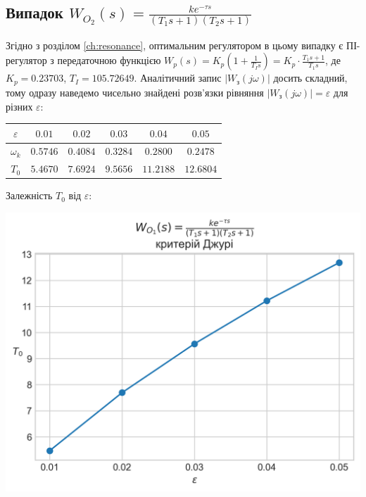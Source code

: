 \subsection{Випадок \texorpdfstring{$W_{O_2}(s) = \frac{k e^{-\tau s}}{(T_1 s + 1)(T_2 s + 1)}$}{2}}
Згідно з розділом \ref{ch:resonance}, оптимальним регулятором в цьому випадку є ПІ-регулятор з передаточною функцією 
$W_p(s) = K_p \left(1 + \frac{1}{T_I s}\right) = K_p \cdot \frac{T_1 s + 1}{T_1 s}$, де $K_p = 0.23703$, $T_I = 105.72649$.
Аналітичний запис $\left| W_{\text{з}}(j\omega) \right|$ досить складний, тому одразу наведемо чисельно знайдені розв'язки
рівняння $\left| W_{\text{з}}(j\omega) \right| = \varepsilon$ для різних $\varepsilon$:
\begin{center}
    \begin{tabular}{|c|c|c|c|c|c|}
        \hline
        $\varepsilon$ & $0.01$ & $0.02$ & $0.03$ & $0.04$ & $0.05$ \\
        \hline
        $\omega_k$ & $0.5746$ & $0.4084$ & $0.3284$ & $0.2800$ & $0.2478$ \\
        \hline
        $T_0$ & $5.4670$ & $7.6924$ & $9.5656$ & $11.2188$ & $12.6804$ \\
        \hline
    \end{tabular}
\end{center}
Залежність $T_0$ від $\varepsilon$:
\begin{center}
    \includegraphics[scale=0.85]{pics/W_02_Jury.png}
\end{center}

